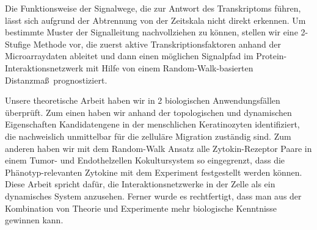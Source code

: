 Die Funktionsweise der Signalwege, die zur Antwort des
Transkriptoms f\"uhren, l\"asst sich aufgrund der Abtrennung
von der Zeitskala nicht direkt erkennen. Um bestimmte
Muster der Signalleitung nachvollziehen zu k\"onnen, stellen
wir eine 2-Stufige Methode vor, die zuerst aktive
Transkriptionsfaktoren anhand der Microarraydaten ableitet und
dann einen m\"oglichen Signalpfad im 
Protein-Interaktionsnetzwerk mit Hilfe von einem 
Random-Walk-basierten Distanzma\ss \ prognostiziert.

Unsere theoretische Arbeit haben wir in 2 biologischen 
Anwendungsf\"allen \"uberpr\"uft. Zum einen haben wir
anhand der topologischen und dynamischen Eigenschaften
Kandidatengene in der menschlichen Keratinozyten 
identifiziert, die nachweislich unmittelbar f\"ur die
zellul\"are Migration zust\"andig sind. Zum anderen
haben wir mit dem Random-Walk Ansatz 
alle Zytokin-Rezeptor Paare in einem Tumor-
und Endothelzellen Kokultursystem so eingegrenzt,
dass die Ph\"anotyp-relevanten Zytokine mit dem Experiment
festgestellt werden k\"onnen. Diese Arbeit spricht daf\"ur,
die Interaktionsnetzwerke in der Zelle als ein dynamisches
System anzusehen. Ferner wurde es rechtfertigt, dass man
aus der Kombination von Theorie und Experimente mehr 
biologische Kenntnisse gewinnen kann.
